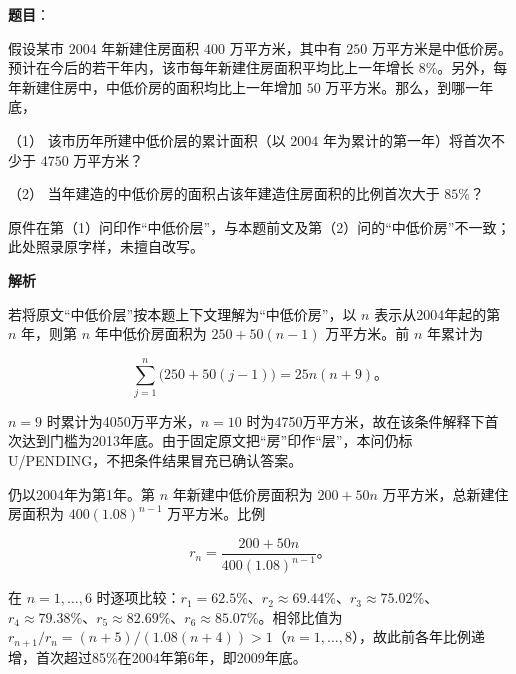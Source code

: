 \begin{answer}

\textbf{题目}：

假设某市 $2004$ 年新建住房面积 $400$ 万平方米，其中有 $250$ 万平方米是中低价房。预计在今后的若干年内，该市每年新建住房面积平均比上一年增长 $8\%$。另外，每年新建住房中，中低价房的面积均比上一年增加 $50$ 万平方米。那么，到哪一年底，

（1） 该市历年所建中低价层的累计面积（以 $2004$ 年为累计的第一年）将首次不少于 $4750$ 万平方米？

（2） 当年建造的中低价房的面积占该年建造住房面积的比例首次大于 $85\%$？

\begin{gktip}
原件在第（1）问印作“中低价层”，与本题前文及第（2）问的“中低价房”不一致；此处照录原字样，未擅自改写。
\end{gktip}

\textbf{解析}


若将原文“中低价层”按本题上下文理解为“中低价房”，以 $n$ 表示从2004年起的第 $n$ 年，则第 $n$ 年中低价房面积为 $250+50(n-1)$ 万平方米。前 $n$ 年累计为

\nopagebreak[4]
\[
\sum_{j=1}^{n}\bigl(250+50(j-1)\bigr)=25n(n+9)\mbox{。}
\]

$n=9$ 时累计为4050万平方米，$n=10$ 时为4750万平方米，故在该条件解释下首次达到门槛为2013年底。由于固定原文把“房”印作“层”，本问仍标 U/PENDING，不把条件结果冒充已确认答案。


仍以2004年为第1年。第 $n$ 年新建中低价房面积为 $200+50n$ 万平方米，总新建住房面积为 $400(1.08)^{n-1}$ 万平方米。比例

\nopagebreak[4]
\[
r_n=\frac{200+50n}{400(1.08)^{n-1}}\mbox{。}
\]

在 $n=1,\ldots,6$ 时逐项比较：$r_1=62.5\%$、$r_2\approx69.44\%$、$r_3\approx75.02\%$、$r_4\approx79.38\%$、$r_5\approx82.69\%$、$r_6\approx85.07\%$。相邻比值为 $r_{n+1}/r_n=(n+5)/(1.08(n+4))>1$（$n=1,\ldots,8$），故此前各年比例递增，首次超过85\%在2004年第6年，即2009年底。



\end{answer}
